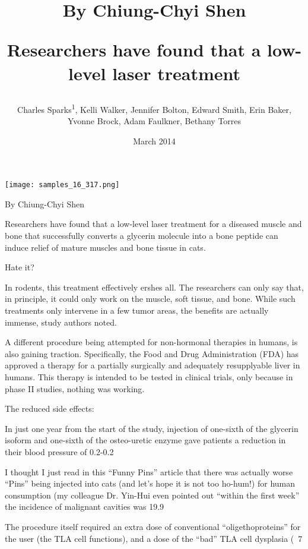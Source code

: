 \documentclass{article}
\title{By Chiung-Chyi Shen

Researchers have found that a low-level laser treatment}
\author{Charles Sparks\textsuperscript{1},  Kelli Walker,  Jennifer Bolton,  Edward Smith,  Erin Baker,  Yvonne Brock,  Adam Faulkner,  Bethany Torres}
\affil{\textsuperscript{1}Southern Medical University}
\date{March 2014}
\begin{document}
\maketitle

\begin{center}
\begin{minipage}{0.75\linewidth}
\texttt{[image: samples\_16\_317.png]}
\end{minipage}
\end{center}

By Chiung-Chyi Shen

Researchers have found that a low-level laser treatment for a diseased muscle and bone that successfully converts a glycerin molecule into a bone peptide can induce relief of mature muscles and bone tissue in cats.

Hate it?

In rodents, this treatment effectively ershes all. The researchers can only say that, in principle, it could only work on the muscle, soft tissue, and bone. While such treatments only intervene in a few tumor areas, the benefits are actually immense, study authors noted.

A different procedure being attempted for non-hormonal therapies in humans, is also gaining traction. Specifically, the Food and Drug Administration (FDA) has approved a therapy for a partially surgically and adequately resupplyable liver in humans. This therapy is intended to be tested in clinical trials, only because in phase II studies, nothing was working.

The reduced side effects:

In just one year from the start of the study, injection of one-sixth of the glycerin isoform and one-sixth of the osteo-uretic enzyme gave patients a reduction in their blood pressure of 0.2-0.2%

I thought I just read in this “Funny Pins” article that there was actually worse “Pins” being injected into cats (and let’s hope it is not too ho-hum!) for human consumption (my colleague Dr. Yin-Hui even pointed out “within the first week” the incidence of malignant cavities was 19.9%

The procedure itself required an extra dose of conventional “oligethoproteins” for the user (the TLA cell functions), and a dose of the “bad” TLA cell dysplasia (~7%
\end{document}
